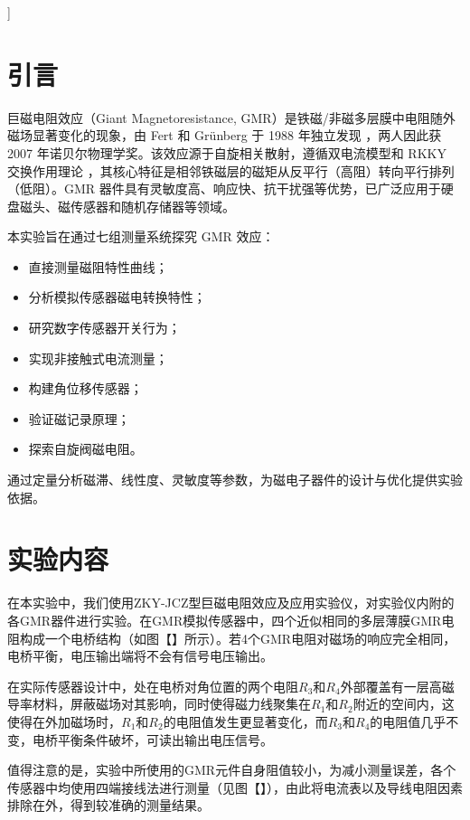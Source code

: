 \documentclass{thuemp}
\begin{document}
]
\wuhao 

\section{引言}
\enlargethispage{-3.3cm}
巨磁电阻效应（Giant Magnetoresistance, GMR）是铁磁/非磁多层膜中电阻随外磁场显著变化的现象，由 Fert 和 Grünberg 于 1988 年独立发现 \cite{BAIBICH19882472,BINASCH19894828}，两人因此获 2007 年诺贝尔物理学奖。该效应源于自旋相关散射，遵循双电流模型和 RKKY 交换作用理论 \cite{PARKIN19902304}，其核心特征是相邻铁磁层的磁矩从反平行（高阻）转向平行排列（低阻）。GMR 器件具有灵敏度高、响应快、抗干扰强等优势，已广泛应用于硬盘磁头、磁传感器和随机存储器等领域。

本实验旨在通过七组测量系统探究 GMR 效应：
\begin{itemize}
    \item 直接测量磁阻特性曲线；
    \item 分析模拟传感器磁电转换特性；
    \item 研究数字传感器开关行为；
    \item 实现非接触式电流测量；
    \item 构建角位移传感器；
    \item 验证磁记录原理；
    \item 探索自旋阀磁电阻。
\end{itemize}
通过定量分析磁滞、线性度、灵敏度等参数，为磁电子器件的设计与优化提供实验依据。

\section{实验内容}

在本实验中，我们使用ZKY-JCZ型巨磁电阻效应及应用实验仪，对实验仪内附的各GMR器件进行实验。在GMR模拟传感器中，四个近似相同的多层薄膜GMR电阻构成一个电桥结构（如图【】所示）。若4个GMR电阻对磁场的响应完全相同，电桥平衡，电压输出端将不会有信号电压输出。

在实际传感器设计中，处在电桥对角位置的两个电阻$R_3$和$R_4$外部覆盖有一层高磁导率材料，屏蔽磁场对其影响，同时使得磁力线聚集在$R_1$和$R_2$附近的空间内，这使得在外加磁场时，$R_1$和$R_2$的电阻值发生更显著变化，而$R_3$和$R_4$的电阻值几乎不变，电桥平衡条件破坏，可读出输出电压信号。

值得注意的是，实验中所使用的GMR元件自身阻值较小，为减小测量误差，各个传感器中均使用四端接线法进行测量（见图【】），由此将电流表以及导线电阻因素排除在外，得到较准确的测量结果。
\end{document}
